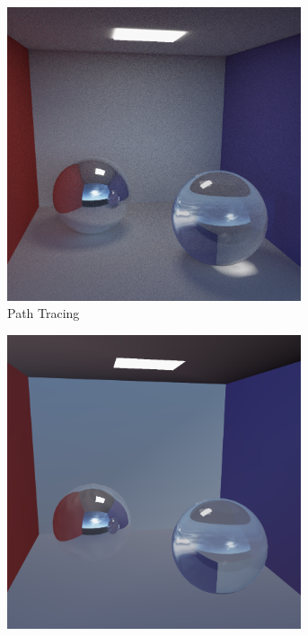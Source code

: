 		\begin{figure}[h]
			\begin{subfigure}[b]{0.33\textwidth}
				\center
				\includegraphics[width=0.95\textwidth]{pic/irrmap-cornell-ref.png}
				\caption{Path Tracing}
				\label{subfig:irrmap-cornell-ref}
			\end{subfigure}
			\begin{subfigure}[b]{0.33\textwidth}
				\center
				\includegraphics[width=0.95\textwidth]{pic/irrmap-cornell-vmap.png}

\end{subfigure}
\end{figure}
